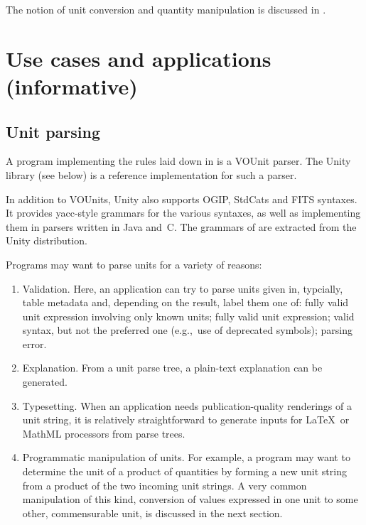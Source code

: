 \documentclass[11pt,a4paper]{ivoa}
\def\eg{e.g.,~}
\begin{document}
The notion of unit conversion and quantity manipulation is discussed in
.

\section{Use cases and applications (informative)\label{sec:useCase}}

\subsection{Unit parsing}
\label{sec:parsers}

A program implementing the rules laid down in 
is a VOUnit parser.   The Unity library (see below) is a
reference implementation for such a parser.

In addition to VOUnits, Unity also supports
OGIP, StdCats and FITS syntaxes.  It provides yacc-style grammars for
the various syntaxes, as well as implementing them in parsers written
in Java and~C.  The grammars of  are extracted
from the Unity distribution.

Programs may want to parse units for a variety of reasons:
\begin{enumerate}
\item Validation.  Here, an application can try to parse units given in,
typcially, table metadata and, depending on the result, label them one of:
fully valid unit expression involving only known units;
fully valid unit expression; valid syntax, but
not the preferred one (\eg  use of deprecated symbols); parsing error.
\item Explanation. From a unit parse tree, a plain-text explanation can
be generated.
\item Typesetting. When an application needs publication-quality
renderings of a unit string, it is relatively straightforward to
generate inputs for \LaTeX\ or MathML processors from parse trees.
\item Programmatic manipulation of units.  For example, a program may
want to determine the unit of a product of quantities by forming a new
unit string from a product of the two incoming unit strings.  A very
common manipulation of this kind, conversion of values expressed in one
unit to some other, commensurable unit, is discussed in the next
section.
\end{enumerate}
\end{document}
